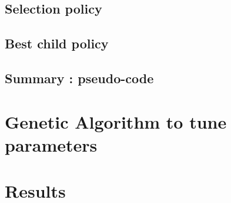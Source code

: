 \documentclass[11pt,a4paper]{article}
\begin{document}
\subsection{Selection policy}
\subsection{Best child policy}
\subsection{Summary : pseudo-code}
\section{Genetic Algorithm to tune parameters}

\section{Results}
\end{document}
